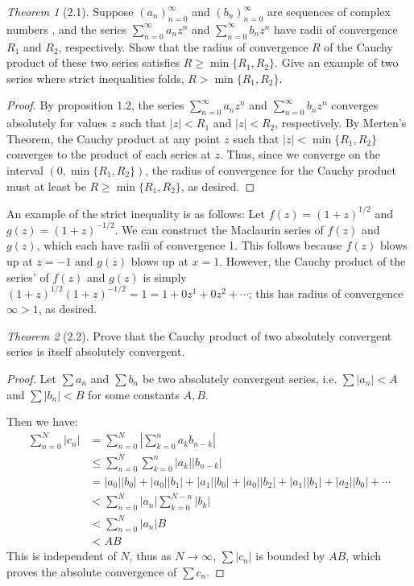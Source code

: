 \documentclass[12pt]{article}
\theoremstyle{remark}
\theoremstyle{named}
\newtheorem*{theorem}{Theorem}
\begin{document}
\begin{theorem}[2.1]
    Suppose \((a_n)^\infty_{n = 0}\) and \((b_n)^\infty_{n = 0}\) are sequences of complex numbers , and the series \(\sum^\infty_{n = 0} a_n z^n\) and \(\sum^\infty_{n = 0} b_n z^n\) have radii of convergence \(R_1\) and \(R_2\), respectively. Show that the radius of convergence \(R\) of the Cauchy product of these two series satisfies \(R \geq \min\{R_1, R_2\}\). Give an example of two series where strict inequalities folds, \(R > \min \{R_1, R_2\}\). 
\end{theorem}

\begin{proof}
    By proposition 1.2, the series \(\sum_{n = 0}^\infty a_n z^n\) and \(\sum_{n = 0}^\infty b_n z^n\) converges absolutely for values \(z\) such that \(|z| < R_1\) and \(|z| < R_2\), respectively. By Merten's Theorem, the Cauchy product at any point \(z\) such that \(|z| < \min \{R_1, R_2\}\) converges to the product of each series at \(z\). Thus, since we converge on the interval \((0, \min\{R_1, R_2\})\), the radius of convergence for the Cauchy product must at least be \(R \geq \min \{R_1, R_2\}\), as desired.
\end{proof}

An example of the strict inequality is as follows: Let \(f(z) = (1 + z)^{1/2}\) and \(g(z) = (1 + z)^{-1/2}\). We can construct the Maclaurin series of \(f(z)\) and \(g(z)\), which each have radii of convergence 1. This follows because \(f(z)\) blows up at \(z = -1\) and \(g(z)\) blows up at \(x = 1\). However, the Cauchy product of the series' of \(f(z)\) and \(g(z)\) is simply \((1 + z)^{1/2}(1 + z)^{-1/2} = 1 = 1 + 0z^1 + 0z^2 + \cdots\); this has radius of convergence \(\infty > 1\), as desired.

\begin{theorem}[2.2]
    Prove that the Cauchy product of two absolutely convergent series is itself absolutely convergent.
\end{theorem}

\begin{proof}
    Let \(\sum a_n\) and \(\sum b_n\) be two absolutely convergent series, i.e. \(\sum |a_n| < A\) and \(\sum |b_n| < B\) for some constants \(A, B\). 

    Then we have:
    \begin{align*}
        \sum_{n = 0}^N |c_n| &= \sum_{n = 0}^N \left |\sum_{k = 0}^n a_k b_{n - k}\right | \\
        &\leq \sum_{n = 0}^N \sum_{k = 0}^n |a_k| |b_{n - k}| \\
        &= |a_0||b_0| + |a_0||b_1| + |a_1||b_0| + |a_0||b_2| + |a_1||b_1| + |a_2||b_0| + \cdots \\
        &< \sum_{n = 0}^N |a_n| \sum_{k = 0}^{N - n} |b_k| \\
        &< \sum_{n = 0}^N |a_n| B \\
        &< AB
    \end{align*}
    This is independent of \(N\), thus as \(N \to \infty\), \(\sum |c_n|\) is bounded by \(AB\), which proves the absolute convergence of \(\sum c_n\).
\end{proof}
\end{document}
